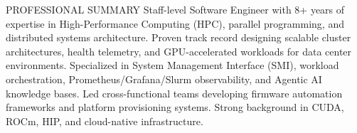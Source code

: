 \documentclass{resume} %
\begin{document}
\def\profile{0}


\begin{rSection}{PROFESSIONAL SUMMARY}
{Staff-level Software Engineer with 8+ years of expertise in High-Performance Computing (HPC), parallel programming, and distributed systems architecture. Proven track record designing scalable cluster architectures, health telemetry, and GPU-accelerated workloads for data center environments. Specialized in System Management Interface (SMI), workload orchestration, Prometheus/Grafana/Slurm observability, and Agentic AI knowledge bases. Led cross-functional teams developing firmware automation frameworks and platform provisioning systems. Strong background in CUDA, ROCm, HIP, and cloud-native infrastructure.}

\end{rSection}




\end{document}
